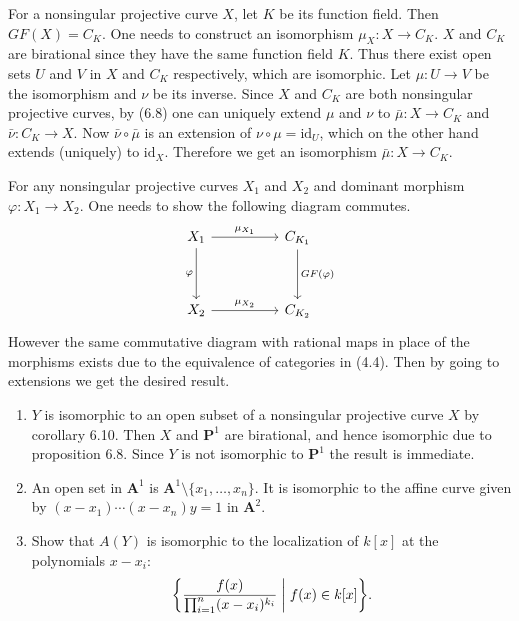 \documentclass{note}
\newcommand{\Affine}[1]{\mathbf{A}^{#1}}
\newcommand{\Proj}[1]{\mathbf{P}^{#1}}
\newcommand{\id}{\mathrm{id}}
\begin{document}
For a nonsingular projective curve $X$, let $K$ be its function
field. Then $GF(X) = C_K$. One needs to construct an isomorphism
$\mu_X\colon X\to C_K$. $X$ and $C_K$ are birational since they have
the same function field $K$. Thus there exist open sets $U$ and $V$ in
$X$ and $C_K$ respectively, which are isomorphic. Let
$\mu\colon U\to V$ be the isomorphism and $\nu$ be its inverse. Since
$X$ and $C_K$ are both nonsingular projective curves, by (6.8) one can
uniquely extend $\mu$ and $\nu$ to $\bar\mu\colon X\to C_K$ and
$\bar\nu\colon C_K\to X$. Now $\bar\nu\circ\bar\mu$ is an extension of
$\nu\circ\mu = \id_U$, which on the other hand extends (uniquely) to
$\id_X$. Therefore we get an isomorphism $\bar\mu\colon X\to C_K$.

For any nonsingular projective curves $X_1$ and $X_2$ and dominant
morphism $\varphi\colon X_1\to X_2$. One needs to show the following
diagram commutes.
\begin{equation*}
  \begin{tikzcd}[row sep=huge,column sep=huge]
    X_1 \arrow{r}{\mu_{X_1}} \arrow[swap]{d}{\varphi} & C_{K_1}
    \arrow{d}{GF(\varphi)} \\
    X_2 \arrow{r}{\mu_{X_2}} & C_{K_2}
  \end{tikzcd}
\end{equation*}
However the same commutative diagram with rational maps in place of
the morphisms exists due to the equivalence of categories in
(4.4). Then by going to extensions we get the desired result.

\begin{enumerate}
\item $Y$ is isomorphic to an open subset of a nonsingular projective
  curve $X$ by corollary 6.10. Then $X$ and $\Proj1$ are birational,
  and hence isomorphic due to proposition 6.8. Since $Y$ is not
  isomorphic to $\Proj1$ the result is immediate.
\item An open set in $\Affine1$ is
  $\Affine1\setminus\{x_1,\dots,x_n\}$. It is isomorphic to the affine
  curve given by $(x-x_1)\cdots(x-x_n)y=1$ in $\Affine2$.
\item Show that $A(Y)$ is isomorphic to the localization of $k[x]$ at
  the polynomials $x-x_i\colon$
  \begin{equation*}
    \left\{ \frac{f(x)}{\prod_{i=1}^n(x-x_i)^{k_i}} \biggm\vert
      f(x) \in k[x] \right\}.
  \end{equation*}
\end{enumerate}
\end{document}
